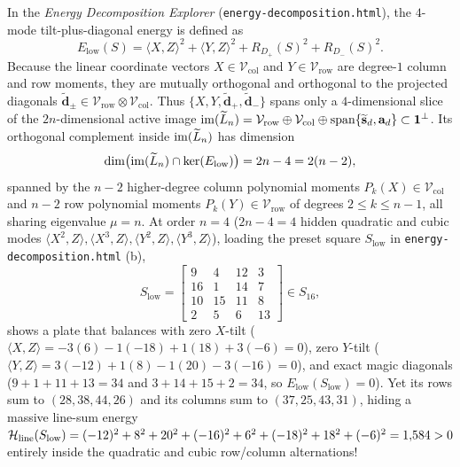 \begin{remark}
\label{rem:low_mode_insufficiency}
In the \emph{Energy Decomposition Explorer} (\texttt{energy-decomposition.html}), the $4$-mode tilt-plus-diagonal energy is defined as
\begin{equation}
  E_{\mathrm{low}}(S) = \langle X,Z\rangle^2 + \langle Y,Z\rangle^2 + R_{D_+}(S)^2 + R_{D_-}(S)^2.
  \label{eq:E_low_def}
\end{equation}
Because the linear coordinate vectors $X \in \mathcal{V}_{\mathrm{col}}$ and $Y \in \mathcal{V}_{\mathrm{row}}$ are degree-$1$ column and row moments, they are mutually orthogonal and orthogonal to the projected diagonals $\widetilde{\mathbf{d}}_\pm \in \mathcal{V}_{\mathrm{row}}\otimes\mathcal{V}_{\mathrm{col}}$. Thus $\{X, Y, \widetilde{\mathbf{d}}_+, \widetilde{\mathbf{d}}_-\}$ spans only a $4$-dimensional slice of the $2n$-dimensional active image $\operatorname{im}(\widetilde{L}_n) = \mathcal{V}_{\mathrm{row}} \oplus \mathcal{V}_{\mathrm{col}} \oplus \operatorname{span}\{\widetilde{\mathbf{s}}_d, \mathbf{a}_d\} \subset \mathbf{1}^\perp$. Its orthogonal complement inside $\operatorname{im}(\widetilde{L}_n)$ has dimension
\begin{equation}
  \dim\bigl(\operatorname{im}(\widetilde{L}_n) \cap \ker(E_{\mathrm{low}})\bigr) = 2n - 4 = 2(n-2),
  \label{eq:high_mode_dim}
\end{equation}
spanned by the $n-2$ higher-degree column polynomial moments $P_k(X) \in \mathcal{V}_{\mathrm{col}}$ and $n-2$ row polynomial moments $P_k(Y) \in \mathcal{V}_{\mathrm{row}}$ of degrees $2 \le k \le n-1$, all sharing eigenvalue $\mu = n$. At order $n=4$ ($2n-4 = 4$ hidden quadratic and cubic modes $\langle X^2,Z\rangle, \langle X^3,Z\rangle, \langle Y^2,Z\rangle, \langle Y^3,Z\rangle$), loading the preset square $S_{\mathrm{low}}$ in \texttt{energy-decomposition.html} (b),
\begin{equation}
  S_{\mathrm{low}} = \begin{bmatrix}
    9 & 4 & 12 & 3 \\
    16 & 1 & 14 & 7 \\
    10 & 15 & 11 & 8 \\
    2 & 5 & 6 & 13
  \end{bmatrix} \in S_{16},
  \label{eq:S_low_matrix}
\end{equation}
shows a plate that balances with zero $X$-tilt ($\langle X,Z\rangle = -3(6)-1(-18)+1(18)+3(-6) = 0$), zero $Y$-tilt ($\langle Y,Z\rangle = 3(-12)+1(8)-1(20)-3(-16) = 0$), and exact magic diagonals ($9+1+11+13 = 34$ and $3+14+15+2 = 34$, so $E_{\mathrm{low}}(S_{\mathrm{low}}) = 0$). Yet its rows sum to $(28, 38, 44, 26)$ and its columns sum to $(37, 25, 43, 31)$, hiding a massive line-sum energy $\mathcal{H}_{\mathrm{line}}(S_{\mathrm{low}}) = (-12)^2 + 8^2 + 20^2 + (-16)^2 + 6^2 + (-18)^2 + 18^2 + (-6)^2 = 1{,}584 > 0$ entirely inside the quadratic and cubic row/column alternations!
\end{remark}

